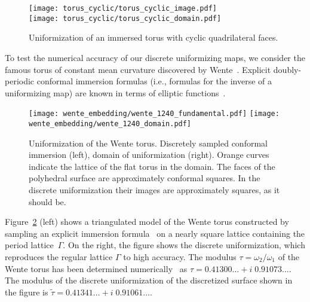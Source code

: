\documentclass[Thesis]{subfiles}
\begin{document}
\begin{figure}%
  \centering
   \texttt{[image: torus\_cyclic/torus\_cyclic\_image.pdf]}\\
   \vspace{1mm}
   \texttt{[image: torus\_cyclic/torus\_cyclic\_domain.pdf]}\\
  \caption{ Uniformization of an immersed torus with cyclic quadrilateral faces.}
\label{fig:torus_cyclic}
\end{figure}


To test the numerical accuracy of our discrete uniformizing maps, we
consider the famous torus of constant mean curvature discovered by
Wente~\cite{wente1986}. Explicit doubly-periodic conformal immersion
formulas (i.e., formulas for the inverse of a uniformizing map) are
known in terms of elliptic functions~\cite{abresch1987, walter1989, bobenko1991}. 

\begin{figure}
\centering
\texttt{[image: wente\_embedding/wente\_1240\_fundamental.pdf]}\hfill
\texttt{[image: wente\_embedding/wente\_1240\_domain.pdf]}
\caption{Uniformization of the Wente torus. Discretely sampled conformal immersion (left), domain of uniformization (right). Orange curves indicate the lattice of the flat torus in the domain. The faces of the polyhedral surface are approximately conformal squares. In the discrete uniformization their images are approximately squares, as it should be.}
\label{fig:wente_torus_embedded}
\end{figure}

Figure~\ref{fig:wente_torus_embedded} (left) shows a triangulated model 
of the Wente torus constructed by sampling
an explicit immersion formula~\cite{bobenko1991} on a nearly square
lattice containing the period lattice~$\Gamma$. On the right, the
figure shows the discrete uniformization, which reproduces the regular
lattice $\Gamma$ to high accuracy. The modulus
$\tau=\omega_{2}/\omega_{1}$ of the Wente torus has been determined
numerically~\cite{Heil95} as $\tau =
0.41300\ldots+i\;0.91073\ldots$\;. The modulus of the discrete
uniformization of the discretized surface shown in the figure is
$\tilde \tau = 0.41341\ldots + i\;0.91061\ldots$\;.
\end{document}
